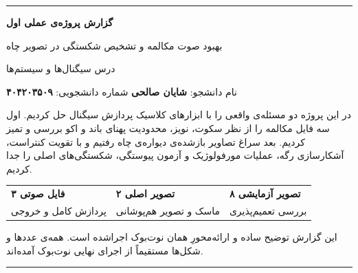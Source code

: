 \documentclass[11pt,a4paper]{article}
\newcommand{\en}[1]{\lr{#1}}
\begin{document}
\pagestyle{plain}

\begin{titlepage}
\thispagestyle{empty}
\vspace*{12mm}

{\color{deepblue}\rule{\textwidth}{2.2pt}}
\vspace{9mm}

{\Huge\bfseries\color{ink}
گزارش پروژه‌ی عملی اول
\par}
\vspace{5mm}
{\LARGE\color{deepblue}
بهبود صوت مکالمه و تشخیص شکستگی در تصویر چاه
\par}

\vspace{7mm}
{\large درس سیگنال‌ها و سیستم‌ها}

\vspace{8mm}

\begin{center}
\begin{tcolorbox}[
  width=0.78\textwidth,
  colback=papermint,
  colframe=mint,
  boxrule=0.9pt,
  arc=2.5mm,
  left=4mm,right=4mm,top=2.5mm,bottom=2.5mm
]
\centering\large
نام دانشجو: \textbf{شایان صالحی}
\qquad
شماره دانشجویی: \textbf{۴۰۴۲۰۳۵۰۹}
\end{tcolorbox}
\end{center}

\vspace{8mm}

\begin{tcolorbox}[
  colback=paperblue,
  colframe=deepblue,
  boxrule=1pt,
  arc=3mm,
  left=6mm,right=6mm,top=5mm,bottom=5mm
]
\large
در این پروژه دو مسئله‌ی واقعی را با ابزارهای کلاسیک پردازش سیگنال حل کردیم. اول سه فایل مکالمه را از نظر سکوت، نویز، محدودیت پهنای باند و اکو بررسی و تمیز کردیم. بعد سراغ تصاویر بازشده‌ی دیواره‌ی چاه رفتیم و با تقویت کنتراست، آشکارسازی رگه، عملیات مورفولوژیک و آزمون پیوستگی، شکستگی‌های اصلی را جدا کردیم.
\end{tcolorbox}

\vfill

\begin{center}
\begin{tabularx}{0.92\textwidth}{>{\centering\arraybackslash}X >{\centering\arraybackslash}X >{\centering\arraybackslash}X}
\cellcolor{deepblue}\color{white}\bfseries ۳ فایل صوتی &
\cellcolor{deepblue}\color{white}\bfseries ۲ تصویر اصلی &
\cellcolor{deepblue}\color{white}\bfseries ۸ تصویر آزمایشی\\
\cellcolor{paperblue}پردازش کامل و خروجی \en{WAV} &
\cellcolor{paperblue}ماسک و تصویر هم‌پوشانی &
\cellcolor{paperblue}بررسی تعمیم‌پذیری
\end{tabularx}
\end{center}

\vfill

{\small\color{ink}
این گزارش توضیح ساده و ارائه‌محورِ همان نوت‌بوک اجراشده است. همه‌ی عددها و شکل‌ها مستقیماً از اجرای نهایی نوت‌بوک آمده‌اند.
}

\vspace{7mm}
{\color{coral}\rule{\textwidth}{1.3pt}}
\end{titlepage}
\end{document}
